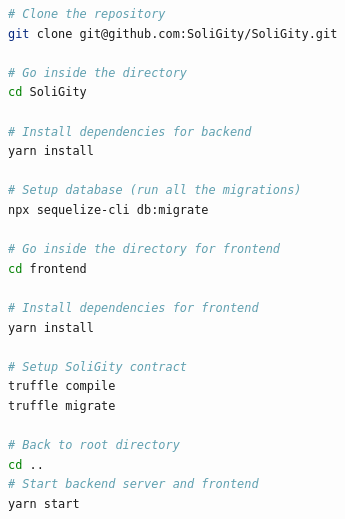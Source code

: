 \documentclass[12pt]{article}
\renewcommand{\_}{\kern-1.5pt\textunderscore\kern-1.5pt}
\begin{document}




\begin{figure}[H]
	\begin{minipage}[t]{0.4\linewidth}
		\begin{lstlisting}[language=bash]
# Clone the repository
git clone git@github.com:SoliGity/SoliGity.git

# Go inside the directory
cd SoliGity

# Install dependencies for backend
yarn install

# Setup database (run all the migrations)
npx sequelize-cli db:migrate

# Go inside the directory for frontend
cd frontend

# Install dependencies for frontend
yarn install

# Setup SoliGity contract
truffle compile
truffle migrate

# Back to root directory
cd ..
# Start backend server and frontend
yarn start
				\end{lstlisting}
				

\end{minipage}
\end{figure}
\end{document}
